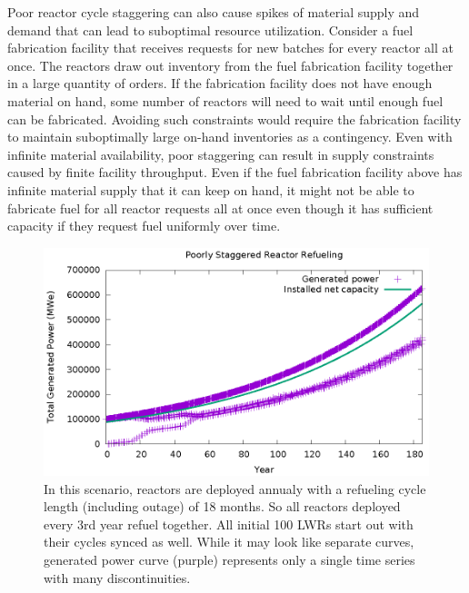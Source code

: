 \documentclass{style}
\begin{document}
Poor reactor cycle staggering can also cause spikes of material supply and
demand that can lead to suboptimal resource utilization.  Consider a fuel
fabrication facility that receives requests for new batches for every reactor
all at once.  The reactors draw out inventory from the fuel fabrication
facility together in a large quantity of orders.  If the fabrication facility
does not have enough material on hand, some number of reactors will need to
wait until enough fuel can be fabricated.  Avoiding such
constraints would require the fabrication facility to maintain suboptimally
large on-hand inventories as a contingency.  Even with infinite material
availability, poor staggering can result in supply constraints caused by
finite facility throughput. Even if the fuel fabrication facility above has
infinite material supply that it can keep on hand, it might not be able to
fabricate fuel for all reactor requests all at once even though it has
sufficient capacity if they request fuel uniformly over time.

\begin{figure}[h]
    \centering
    \includegraphics[width=1.0\columnwidth]{exp2/sync-cycle.eps}
    \caption[The cycle staggering effect]{
        In this scenario, reactors are deployed annualy with a refueling cycle
        length (including outage) of 18 months.  So all reactors deployed
        every 3rd year refuel together.  All initial 100 LWRs start out with
        their cycles synced as well.  While it may look like separate curves,
        generated power curve (purple) represents only a single time series with many discontinuities.
    }
    \label{fig:sync-cycle}
\end{figure}
\end{document}
